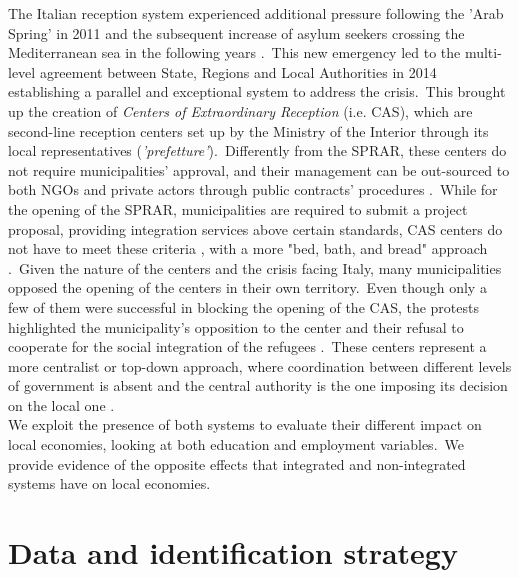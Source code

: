 \documentclass[authoryear,preprint,review,12pt]{elsarticle}
\begin{document}
\noindent
The Italian reception system experienced additional pressure following the 'Arab Spring' in 2011 and the subsequent increase of asylum seekers crossing the Mediterranean sea in the following years \citep{campesi2018}.\ This new emergency led to the multi-level agreement between State, Regions and Local Authorities in 2014 establishing a parallel and exceptional system to address the crisis.\ This brought up the creation of \textit{Centers of Extraordinary Reception} (i.e. CAS), which are second-line reception centers set up by the Ministry of the Interior through its local representatives (\textit{'prefetture'}).\ Differently from the SPRAR, these centers do not require municipalities' approval, and their management can be out-sourced to both NGOs and private actors through public contracts' procedures \citep{ricardguay2019}.\ While for the opening of the SPRAR, municipalities are required to submit a project proposal, providing integration services above certain standards, CAS centers do not have to meet these criteria \citep{campesi2018}, with a more "bed, bath, and bread" approach \citep{campomori2020}.\ Given the nature of the centers and the crisis facing Italy, many municipalities opposed the opening of the centers in their own territory.\ Even though only a few of them were successful in blocking the opening of the CAS, the protests highlighted the municipality's opposition to the center and their refusal to cooperate for the social integration of the refugees \citep{campomori2020}.\ These centers represent a more centralist or top-down approach, where coordination between different levels of government is absent and the central authority is the one imposing its decision on the local one \citep{scholten2018}.\\ 

\noindent
We exploit the presence of both systems to evaluate their different impact on local economies, looking at both education and employment variables.\ We provide evidence of the opposite effects that integrated and non-integrated systems have on local economies.\\ 

\section*{Data and identification strategy}
\end{document}
